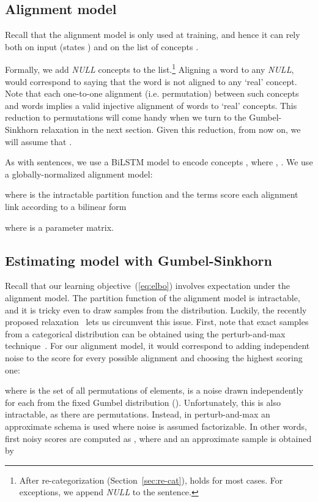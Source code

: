 \documentclass[11pt,a4paper]{article}
\begin{document}
\subsection{Alignment model}
\label{sec:align-mod}
Recall that the alignment model is only used at training, and hence it can rely both on input (states ) and on the list of concepts . 

Formally, we add 
\textit{NULL} concepts to the list.\footnote{After re-categorization (Section~\ref{sec:re-cat}),  holds for most cases. For exceptions, we append \textit{NULL} to the sentence.} 
Aligning a word to any \textit{NULL}, would correspond to saying that the word is not aligned to any `real' concept. Note that each one-to-one alignment (i.e. permutation) between  such concepts and  words implies a valid  injective alignment of  words to  `real' concepts. This reduction to permutations will come handy when we turn to the Gumbel-Sinkhorn relaxation in the next section. 
Given this reduction, from now on, we will assume that . 

As with sentences, we use a BiLSTM model to encode concepts , where , . We use a globally-normalized alignment model:

where  is the intractable partition function and the terms  score each alignment link according to a bilinear form

where  is a parameter matrix.

\subsection{Estimating model with Gumbel-Sinkhorn}\label{sec:sink}

Recall that our learning objective~(\ref{eq:elbo}) involves expectation under the alignment model. The partition function of the alignment model   is intractable, and it is tricky even to draw samples from the distribution. Luckily, the recently proposed relaxation~\cite{sinkhorn} lets us circumvent this issue. First, note that exact samples from a categorical distribution can be obtained using the perturb-and-max technique~\cite{papandreou2011perturb}. For our alignment model, it would correspond to adding independent noise to the score for every possible alignment and choosing the highest scoring one:

where  is the set of all permutations of  elements,
 is a noise drawn independently for each  from the fixed Gumbel distribution (). Unfortunately, this is also intractable, as there are  permutations. Instead, in perturb-and-max
an approximate schema is used where noise is assumed factorizable. In other words, first noisy scores are computed as , where  and an approximate sample is obtained by
\end{document}
